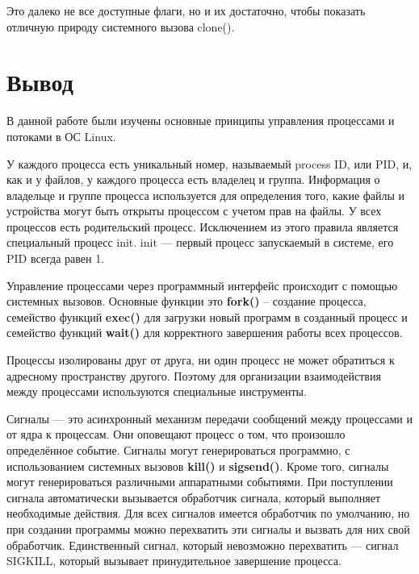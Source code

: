 \documentclass[a4paper]{article}
\begin{document}
	Это далеко не все доступные флаги, но и их достаточно, чтобы показать отличную природу системного вызова clone().
\section{Вывод}
	В данной работе были изучены основные принципы управления процессами и потоками в ОС Linux. 
	
	У каждого процесса есть уникальный номер, называемый process ID, или PID, и, как и у файлов, у каждого процесса есть владелец и группа. Информация о владельце и группе процесса используется для определения того, какие файлы и устройства могут быть открыты процессом с учетом прав на файлы. У всех процессов есть родительский процесс. Исключением из этого правила является специальный процесс init. init --- первый процесс запускаемый в системе, его PID всегда равен 1.
	
	Управление процессами через программный интерфейс происходит с помощью системных вызовов. Основные функции это \textbf{fork()} -- создание процесса, семейство функций \textbf{exec()} для загрузки новый программ в созданный процесс и семейство функций \textbf{wait()} для корректного завершения работы всех процессов.
	
	Процессы изолированы друг от друга, ни один процесс не может обратиться к адресному пространству другого. Поэтому для организации взаимодействия между процессами используются специальные инструменты.
	
	Сигналы — это асинхронный механизм передачи сообщений между процессами и от ядра к процессам. Они оповещают процесс о том, что произошло определённое событие. Сигналы могут генерироваться программно, с использованием системных вызовов \textbf{kill()} и \textbf{sigsend()}. Кроме того, сигналы могут генерироваться различными аппаратными событиями.  При поступлении сигнала автоматически вызывается обработчик сигнала, который выполняет необходимые действия. Для всех сигналов имеется обработчик по умолчанию, но при создании программы можно перехватить эти сигналы и вызвать для них свой обработчик. Единственный сигнал, который невозможно перехватить --- сигнал SIGKILL, который вызывает принудительное завершение процесса.
	
\end{document}
